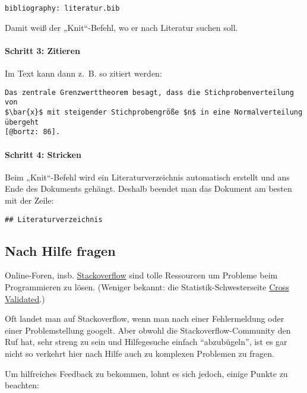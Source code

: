 \documentclass[11pt,german,a4paper]{article}
\let\oldparagraph\paragraph
\renewcommand{\paragraph}[1]{\oldparagraph{#1}\mbox{}}
\begin{document}
\begin{verbatim}
bibliography: literatur.bib
\end{verbatim}

Damit weiß der „Knit``-Befehl, wo er nach Literatur suchen soll.

\hypertarget{schritt-3-zitieren}{%
\paragraph{Schritt 3: Zitieren}\label{schritt-3-zitieren}}

Im Text kann dann z.~B. so zitiert werden:

\begin{verbatim}
Das zentrale Grenzwerttheorem besagt, dass die Stichprobenverteilung von
$\bar{x}$ mit steigender Stichprobengröße $n$ in eine Normalverteilung übergeht
[@bortz: 86].
\end{verbatim}

\hypertarget{schritt-4-stricken}{%
\paragraph{Schritt 4: Stricken}\label{schritt-4-stricken}}

Beim „Knit``-Befehl wird ein Literaturverzeichnis automatisch erstellt und ans Ende des Dokuments gehängt. Deshalb beendet man das Dokument am besten mit der Zeile:

\begin{verbatim}
## Literaturverzeichnis
\end{verbatim}

\hypertarget{nach-hilfe-fragen}{%
\subsection{Nach Hilfe fragen}\label{nach-hilfe-fragen}}

Online-Foren, insb. \href{https://stackoverflow.com}{Stackoverflow} sind tolle Ressourcen um Probleme beim Programmieren zu lösen. (Weniger bekannt: die Statistik-Schwesterseite \href{https://stats.stackexchange.com}{Cross Validated}.)

Oft landet man auf Stackoverflow, wenn man nach einer Fehlermeldung oder einer Problemstellung googelt. Aber obwohl die Stackoverflow-Community den Ruf hat, sehr streng zu sein und Hilfegesuche einfach ``abzubügeln'', ist es gar nicht so verkehrt hier nach Hilfe auch zu komplexen Problemen zu fragen.

Um hilfreiches Feedback zu bekommen, lohnt es sich jedoch, einige Punkte zu beachten:
\end{document}
